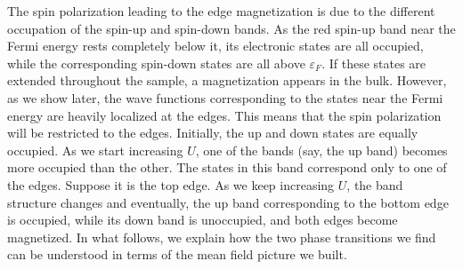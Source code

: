 The spin polarization leading to the edge magnetization is due to the different occupation of the spin-up and spin-down bands.
As the red spin-up band near the Fermi energy rests completely below it, its electronic states are all occupied, while the corresponding spin-down states are all above $\varepsilon_F$.
If these states are extended throughout the sample, a magnetization appears in the bulk.
However, as we show later, the wave functions corresponding to the states near the Fermi energy are heavily localized at the edges.
This means that the spin polarization will be restricted to the edges.
Initially, the up and down states are equally occupied.
As we start increasing $U$, one of the bands (say, the up band) becomes more occupied than the other.
The states in this band correspond only to one of the edges.
Suppose it is the top edge.
As we keep increasing $U$, the band structure changes and eventually, the up band corresponding to the bottom edge is occupied, while its down band is unoccupied, and both edges become magnetized.
In what follows, we explain how the two phase transitions we find can be understood in terms of the mean field picture we built.

